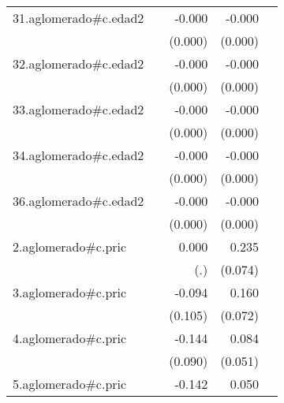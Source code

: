 {\begin{longtable}{l*{4}{D{.}{.}{-1}}}
\addlinespace
31.aglomerado#c.edad2&                     &      -0.000         &      -0.000\sym{**} &                     \\
            &                     &     (0.000)         &     (0.000)         &                     \\
\addlinespace
32.aglomerado#c.edad2&                     &      -0.000         &      -0.000\sym{***}&                     \\
            &                     &     (0.000)         &     (0.000)         &                     \\
\addlinespace
33.aglomerado#c.edad2&                     &      -0.000         &      -0.000\sym{***}&                     \\
            &                     &     (0.000)         &     (0.000)         &                     \\
\addlinespace
34.aglomerado#c.edad2&                     &      -0.000         &      -0.000\sym{**} &                     \\
            &                     &     (0.000)         &     (0.000)         &                     \\
\addlinespace
36.aglomerado#c.edad2&                     &      -0.000         &      -0.000\sym{*}  &                     \\
            &                     &     (0.000)         &     (0.000)         &                     \\
\addlinespace
2.aglomerado#c.pric&                     &       0.000         &       0.235\sym{**} &                     \\
            &                     &         (.)         &     (0.074)         &                     \\
\addlinespace
3.aglomerado#c.pric&                     &      -0.094         &       0.160\sym{*}  &                     \\
            &                     &     (0.105)         &     (0.072)         &                     \\
\addlinespace
4.aglomerado#c.pric&                     &      -0.144         &       0.084         &                     \\
            &                     &     (0.090)         &     (0.051)         &                     \\
\addlinespace
5.aglomerado#c.pric&                     &      -0.142         &       0.050         &                     \\

\end{longtable}}
